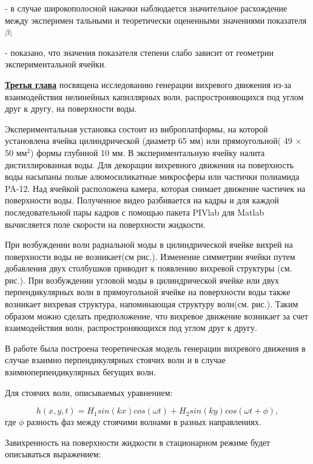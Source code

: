 - в случае широко­полосной накачки наблюдается значительное расхождение между эксперимен­
тальными и теоретически оцененными значениями показателя $\beta$; 

- показано, что значения показателя степени слабо зависит от геометрии экспериментальной ячейки.

\underline{\textbf{Третья глава}} посвящена исследованию генерации вихревого движения из-за взаимодействия нелинейных капиллярных волн, распростроняющихся под углом друг к другу, на поверхности воды.

Экспериментальная установка состоит из виброплатформы, на которой установлена ячейка цилиндрической (диаметр 65 мм) или прямоугольной( 49 $\times$ 50 мм$^2$) формы глубиной 10 мм. В экспериментальную ячейку налита дистиллированная воды. Для декорации вихревного движения на поверхность воды насыпаны полые алюмосиликатные микросферы или частички полиамида PA-12. Над ячейкой расположена камера, которая снимает движение частичек на поверхности воды. Полученное видео разбивается на кадры и для каждой последовательной пары кадров с помощью пакета PIVlab для Matlab \cite{PIVlab} вычисляется поле скорости на поверхности жидкости.

При возбуждении волн радиальной моды в цилиндрической ячейке вихрей на поверхности воды не возникает(см рис.). Изменение симметрии ячейки путем добавления двух столбушков приводит к появлению вихревой структуры (см. рис.). При возбуждении угловой моды в цилиндрической ячейке или двух перпендикулярных волн в прямоугольной ячейке на поверхности воды также возникает вихревая структура, напоминающая структуру волн(см. рис.). Таким образом можно сделать предположение, что вихревое движение возникает за счет взаимодействия волн, распростроняющихся под углом друг к другу.

В работе \cite{F6} была построена теоретическая модель генерации вихревого движения в случае взаимно перпендикулярных стоячих волн и в случае взимноперпендикулярных бегущих волн.

Для стоячих волн, описываемых уравнением:

\begin{equation}
\label{eq:waveStand}
h(x, y, t) = H_1 sin(kx)cos(\omega t)+H_2 sin(ky)cos(\omega t+ \phi),
\end{equation}
где $\phi$ разность фаз между стоячими волнами в разных направлениях.

Завихренность на поверхности жидкости в стационарном режиме будет описываться выражением:

